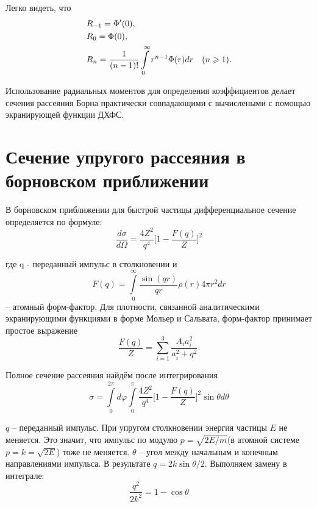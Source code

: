 \documentclass[a4paper,14pt]{extarticle} %
\begin{document}
Легко видеть, что
\[
\begin{gathered}
  {R_{ - 1}} = \Phi '(0), \hfill \\
  {R_0} = \Phi (0), \hfill \\
  {R_n} = \frac{1}
{{(n - 1)!}}\int\limits_0^\infty  {{r^{n - 1}}\Phi (r)dr\quad (n \geqslant 1).}  \hfill \\
\end{gathered}
\]

Использование радиальных моментов для определения коэффициентов делает сечения рассеяния Борна практически 
совпадающими с вычислеными с помощью экранирующей функции ДХФС. 


\section{Сечение упругого рассеяния в борновском приближении}

В борновском приближении для быстрой частицы дифференциальное сечение определяется по формуле:
\begin{equation*}
	\frac{d\sigma}{d\Omega} =
	\frac{4Z^2}{q^4}
	\Big[
		1 - \frac{F(q)}{Z}
	\Big]^2
\end{equation*}

где q - переданный импульс в столкновении и 
\begin{equation}
F(q)=\int\limits_0^{\infty}\frac{\sin(qr)}{qr}\rho(r)4\pi r^2dr
\label{eq:b2}
\end{equation}
-- атомный форм-фактор. Для плотности, связанной аналитическими экранирующими функциями в форме Мольер и Сальвата, форм-фактор 
принимает простое выражение 
\begin{equation}
\frac{F(q)}{Z}=\sum_{i=1}^3\frac{A_ia_i^2}{a_i^2+q^2}.
\label{eq:b3}
\end{equation}

Полное сечение рассеяния найдём после интегрирования 
\begin{equation}
\sigma =
\int\limits_0^{2\pi}
d\varphi
\int\limits_0^\pi
\frac{4Z^2}{q^4}
	\Big[
		1 - \frac{F(q)}{Z}
	\Big]^2
\sin \theta
d\theta
\end{equation}
 
$q$ -- переданный импульс. При упругом столкновении энергия частицы $E$ не меняется. Это значит, что импульс по модулю $p = \sqrt{2E/m}$(в атомной системе $p = k = \sqrt{2E}$) тоже не меняется. $\theta$ -- угол между начальным и конечным направлениями импульса. В результате $q = 2 k \sin \theta/2$. Выполняем замену в интеграле:
\begin{equation}
\frac{q^2}{2k^2} = 1-\cos \theta
\end{equation}
\end{document}
